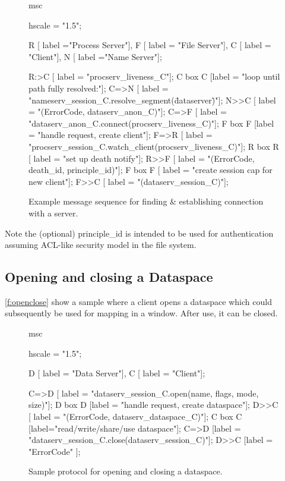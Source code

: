 \begin{figure}[htb]
  \begin{center}
    \begin{msc}
      msc {
        hscale = "1.5";

        R [ label ="Process Server"],
        F [ label = "File Server"],
        C [ label = "Client"],
        N [ label ="Name Server"];

        R:>C [ label = "procserv\_liveness\_C"];
        C box C [label = "loop until path fully resolved:"];
        C=>N [ label = "nameserv\_session\_C.resolve\_segment(\"dataserver\")"];
        N>>C [ label = "(ErrorCode, dataserv\_anon\_C)"];
        C=>F [ label = "dataserv\_anon\_C.connect(procserv\_liveness\_C)"];
        F box F [label = "handle request, create client"];
        F=>R [ label = "procserv\_session\_C.watch\_client(procserv\_liveness\_C)"];
        R box R [ label = "set up death notify"];
        R>>F [ label = "(ErrorCode, death\_id, principle\_id)"];
        F box F [ label = "create session cap for new client"];
        F>>C [ label = "(dataserv\_session\_C)"];
      }
    \end{msc}
  \end{center}
  \caption{Example message sequence for finding \& establishing connection with a server.}
  \label{f:estab}
\end{figure}

Note the (optional) principle\_id is intended to be used for authentication assuming
ACL-like security model in the file system.

\pagebreak

\subsection{Opening and closing a Dataspace}

\autoref{f:openclose} show a sample where a client opens a dataspace which
could subsequently be used for mapping in a window. After use, it can be
closed.

\begin{figure}[htb]
  \begin{center}
    \begin{msc}
      msc {
        hscale = "1.5";

        D [ label = "Data Server"],
        C [ label = "Client"];

        C=>D [ label = "dataserv\_session\_C.open(name, flags, mode, size)"];
        D box D [label = "handle request, create dataspace"];
        D>>C [ label = "(ErrorCode, dataserv\_dataspace\_C)"];
        C box C [label="read/write/share/use dataspace"];
        C=>D [label = "dataserv\_session\_C.close(dataserv\_session\_C)"];
        D>>C [label = "ErrorCode" ];
      }
    \end{msc}
  \end{center}
  \caption{Sample protocol for opening and closing a dataspace.}
  \label{f:openclose}
\end{figure}


